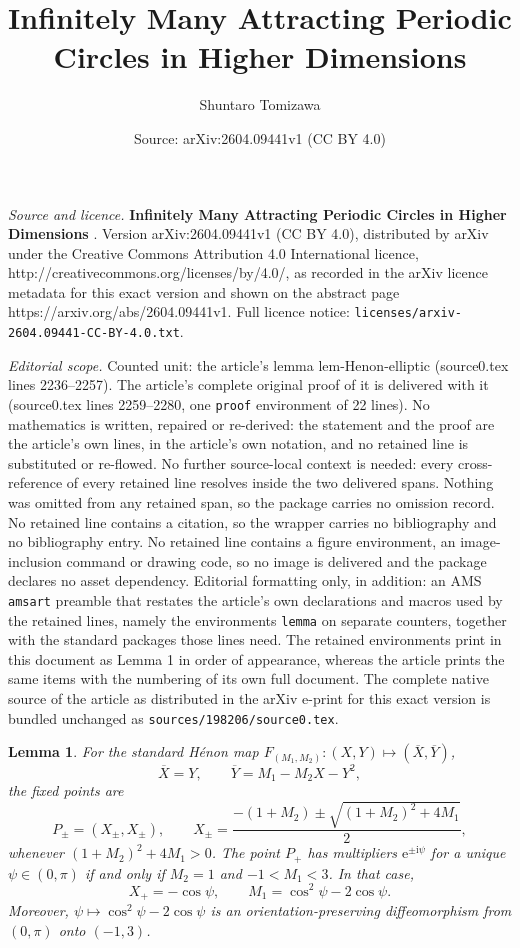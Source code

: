 \documentclass[10pt,a4paper]{amsart}
\title{\textbf{ Infinitely Many Attracting Periodic Circles in Higher Dimensions }}
\author{Shuntaro Tomizawa}
\date{Source: arXiv:2604.09441v1 (CC BY 4.0)}
\newtheorem{lemma}{Lemma}
\begin{document}
\maketitle

\noindent\emph{Source and licence.} \textbf{ Infinitely Many Attracting Periodic Circles in Higher Dimensions }. Version arXiv:2604.09441v1 (CC BY 4.0), distributed by arXiv under the Creative Commons Attribution 4.0 International licence, http://creativecommons.org/licenses/by/4.0/, as recorded in the arXiv licence metadata for this exact version and shown on the abstract page https://arxiv.org/abs/2604.09441v1. Full licence notice: \texttt{licenses/arxiv-2604.09441-CC-BY-4.0.txt}.\par\smallskip

\noindent\textit{Editorial scope.} Counted unit: the article's lemma lem-Henon-elliptic (source0.tex lines 2236--2257). The article's complete original proof of it is delivered with it (source0.tex lines 2259--2280, one \texttt{proof} environment of 22 lines). No mathematics is written, repaired or re-derived: the statement and the proof are the article's own lines, in the article's own notation, and no retained line is substituted or re-flowed.  No further source-local context is needed: every cross-reference of every retained line resolves inside the two delivered spans.  Nothing was omitted from any retained span, so the package carries no omission record.  No retained line contains a citation, so the wrapper carries no bibliography and no bibliography entry.  No retained line contains a figure environment, an image-inclusion command or drawing code, so no image is delivered and the package declares no asset dependency.  Editorial formatting only, in addition: an AMS \texttt{amsart} preamble that restates the article's own declarations and macros used by the retained lines, namely the environments \texttt{lemma} on separate counters, together with the standard packages those lines need.  The retained environments print in this document as Lemma 1 in order of appearance, whereas the article prints the same items with the numbering of its own full document.  The complete native source of the article as distributed in the arXiv e-print for this exact version is bundled unchanged as \texttt{sources/198206/source0.tex}.
\begin{lemma}\label{lem-Henon-elliptic}
For the standard H\'enon map $F_{(M_1,M_2)}: (X, Y) \longmapsto (\overline{X}, \overline{Y})$,
\begin{equation}
\label{eq-Hen}
\overline{X} = Y,
\qquad
\overline{Y} = M_1 - M_2 X - Y^2,
\end{equation}
the fixed points are
\[
P_\pm = (X_\pm,X_\pm),
\qquad
X_\pm = \frac{-(1+M_2) \pm \sqrt{(1+M_2)^2 + 4M_1}}{2},
\]
whenever $(1+M_2)^2 + 4M_1 > 0$. The point $P_+$ has multipliers $\mathrm{e}^{\pm \mathrm{i}\psi}$ for a unique $\psi \in (0,\pi)$ if and only if $M_2 = 1$ and $-1 < M_1 < 3$. In that case,
\[
X_+ = -\cos\psi,
\qquad
M_1 = \cos^2\psi - 2\cos\psi.
\]
Moreover, $\psi \longmapsto \cos^2\psi - 2\cos\psi$ is an orientation-preserving diffeomorphism from $(0,\pi)$ onto $(-1,3)$.
\end{lemma}
\end{document}
